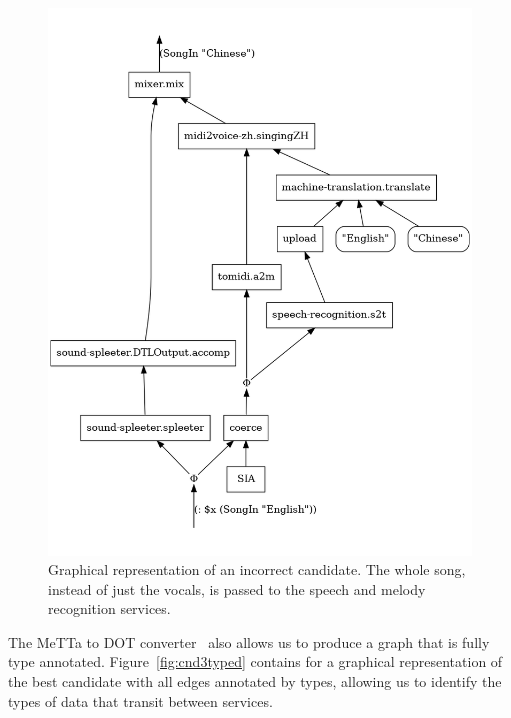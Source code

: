 \documentclass[]{report}
\begin{document}
\begin{figure}[H]
  \centering
  \includegraphics[scale=0.35]{figs/incorrect-cnd.png}
  \caption{Graphical representation of an incorrect candidate.  The
    whole song, instead of just the vocals, is passed to the speech
    and melody recognition services.}
  \label{fig:inccnd}
\end{figure}
The MeTTa to DOT converter~\cite{MeTTaToDOT} also allows us to produce
a graph that is fully type annotated.  Figure~\ref{fig:cnd3typed}
contains for a graphical representation of the best candidate with all
edges annotated by types, allowing us to identify the types of data
that transit between services.
\end{document}
